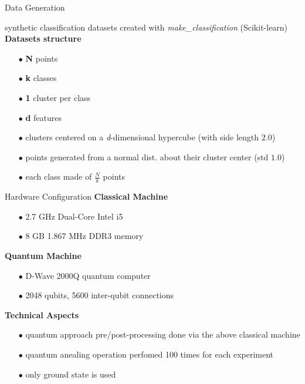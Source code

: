 		\begin{frame}{Data Generation}

			synthetic classification datasets created with \textit{make\_classification} (Scikit-learn)	\\
			\textbf{Datasets structure}
			\begin{itemize}
				\item[$\bullet$] \textbf{N} points	
				\item[$\bullet$] \textbf{k} classes	
				\item[$\bullet$] \textbf{1} cluster per class	
				\item[$\bullet$] \textbf{d} features 
				\item[$\bullet$] clusters centered on a \textit{d}-dimensional hypercube (with side length $2.0$)  
				\item[$\bullet$] points generated from a normal dist. about their cluster center (std $1.0$)   
				\item[$\bullet$] each class made of $\frac{N}{k}$ points   
			\end{itemize}
			
		\end{frame}

		\begin{frame}{Hardware Configuration}	
			\textbf{Classical Machine}
			\begin{itemize}
				\item[$\bullet$] 2.7 GHz Dual-Core Intel i5 
				\item[$\bullet$] 8 GB 1.867 MHz DDR3 memory 
			\end{itemize}

			\textbf{Quantum Machine}
			\begin{itemize}
				\item[$\bullet$] D-Wave 2000Q quantum computer 
				\item[$\bullet$] 2048 qubits, 5600 inter-qubit connections
			\end{itemize}

			\textbf{Technical Aspects}
			\begin{itemize}
				\item[$\bullet$] quantum approach pre/post-processing done via the above classical machine
				\item[$\bullet$] quantum anealing operation perfomed 100 times for each experiment   
				\item[$\bullet$] only ground state is used %
			\end{itemize}			
					
		\end{frame}
	
